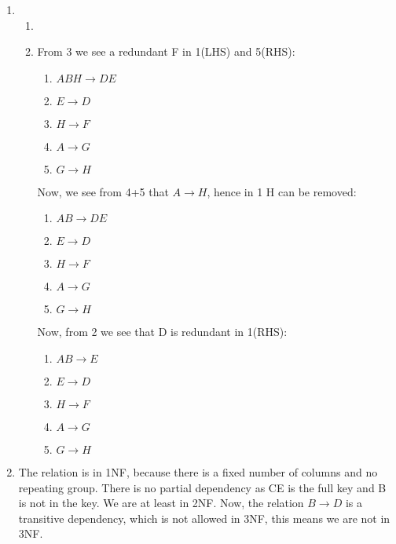 \documentclass[12pt]{extarticle}
\begin{document}
\begin{flushleft}
\begin{enumerate}
\item 
\begin{enumerate}
\item 
\item From 3 we see a redundant F in 1(LHS) and 5(RHS):
\begin{enumerate}
\item $ABH\rightarrow DE$
\item $E\rightarrow D$
\item $H \rightarrow F$
\item $A\rightarrow G$
\item $G\rightarrow H$
\end{enumerate}
Now, we see from 4+5 that $A\rightarrow H$, hence in 1 H can be removed:
\begin{enumerate}
\item $AB\rightarrow DE$
\item $E\rightarrow D$
\item $H \rightarrow F$
\item $A\rightarrow G$
\item $G\rightarrow H$
\end{enumerate}

Now, from 2 we see that D is redundant in 1(RHS):
\begin{enumerate}
\item $AB\rightarrow E$
\item $E\rightarrow D$
\item $H \rightarrow F$
\item $A\rightarrow G$
\item $G\rightarrow H$
\end{enumerate}
\end{enumerate}



\item
The relation is in 1NF, because there is a fixed number of columns and no repeating group. There is no partial dependency as CE is the full key and B is not in the key. We are at least in  2NF. Now, the relation $B\rightarrow D$ is a transitive dependency, which is not allowed in 3NF, this means we are not in 3NF.
\end{enumerate}
\end{flushleft}
\end{document}
